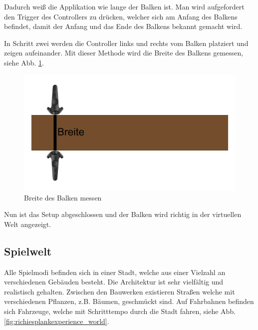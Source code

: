Dadurch weiß die Applikation wie lange der Balken ist.
Man wird aufgefordert den Trigger des Controllers zu drücken, welcher sich am Anfang des Balkens befindet, damit der Anfang und das Ende des Balkens bekannt gemacht wird.



In Schritt zwei werden die Controller links und rechts vom Balken platziert und zeigen aufeinander.
Mit dieser Methode wird die Breite des Balkens gemessen, siehe Abb. \ref{fig:beam_width_measurement}.

\begin {figure}
    \includegraphics[scale=0.18]{pics/beam_width_measurement}
    \caption{Breite des Balken messen}
    \label{fig:beam_width_measurement}
\end {figure}


Nun ist das Setup abgeschlossen und der Balken wird richtig in der virtuellen Welt angezeigt.
~\cite{ToastGames_2021_Setup}

\subsection{Spielwelt}
\label{sec:richiesplankexperience_world}
Alle Spielmodi befinden sich in einer Stadt, welche aus einer Vielzahl an verschiedenen Gebäuden besteht.
Die Architektur ist sehr vielfältig und realistisch gehalten.
Zwischen den Bauwerken existieren Straßen welche mit verschiedenen Pflanzen, z.B. Bäumen, geschmückt sind.
Auf Fahrbahnen befinden sich Fahrzeuge, welche mit Schritttempo durch die Stadt fahren, siehe Abb. \ref{fig:richiesplankexperience_world}.

